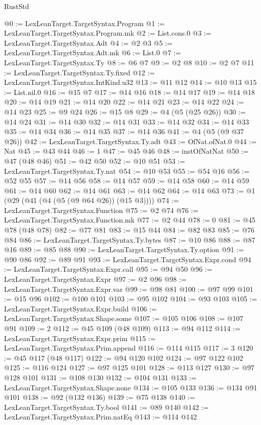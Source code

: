 \begin{lexlean}{RustStd}
\begin{coremodule}
@0 := LexLeanTarget.TargetSyntax.Program
@1 := LexLeanTarget.TargetSyntax.Program.mk
@2 := List.cons.{0}
@3 := LexLeanTarget.TargetSyntax.Adt
@4 := @2 @3
@5 := LexLeanTarget.TargetSyntax.Adt.mk
@6 := List.{0}
@7 := LexLeanTarget.TargetSyntax.Ty
@8 := @6 @7
@9 := @2 @8
@10 := @2 @7
@11 := LexLeanTarget.TargetSyntax.Ty.fixed
@12 := LexLeanTarget.TargetSyntax.IntKind.u32
@13 := @11 @12
@14 := @10 @13
@15 := List.nil.{0}
@16 := @15 @7
@17 := @14 @16
@18 := @14 @17
@19 := @14 @18
@20 := @14 @19
@21 := @14 @20
@22 := @14 @21
@23 := @14 @22
@24 := @14 @23
@25 := @9 @24
@26 := @15 @8
@29 := @4 (@5 (@25 @26))
@30 := @14 @24
@31 := @14 @30
@32 := @14 @31
@33 := @14 @32
@34 := @14 @33
@35 := @14 @34
@36 := @14 @35
@37 := @14 @36
@41 := @4 (@5 (@9 @37 @26))
@42 := LexLeanTarget.TargetSyntax.Ty.adt
@43 := OfNat.ofNat.{0}
@44 := Nat
@45 := @43 @44
@46 := 1
@47 := @45 @46
@48 := instOfNatNat
@50 := @47 (@48 @46)
@51 := @42 @50
@52 := @10 @51
@53 := LexLeanTarget.TargetSyntax.Ty.nat
@54 := @10 @53
@55 := @54 @16
@56 := @52 @55
@57 := @14 @56
@58 := @14 @57
@59 := @14 @58
@60 := @14 @59
@61 := @14 @60
@62 := @14 @61
@63 := @14 @62
@64 := @14 @63
@73 := @1 (@29 (@41 (@4 (@5 (@9 @64 @26)) (@15 @3))))
@74 := LexLeanTarget.TargetSyntax.Function
@75 := @2 @74
@76 := LexLeanTarget.TargetSyntax.Function.mk
@77 := @2 @44
@78 := 0
@81 := @45 @78 (@48 @78)
@82 := @77 @81
@83 := @15 @44
@84 := @82 @83
@85 := @76 @84
@86 := LexLeanTarget.TargetSyntax.Ty.bytes
@87 := @10 @86
@88 := @87 @16
@89 := @85 @88
@90 := LexLeanTarget.TargetSyntax.Ty.option
@91 := @90 @86
@92 := @89 @91
@93 := LexLeanTarget.TargetSyntax.Expr.cond
@94 := LexLeanTarget.TargetSyntax.Expr.call
@95 := @94 @50
@96 := LexLeanTarget.TargetSyntax.Expr
@97 := @2 @96
@98 := LexLeanTarget.TargetSyntax.Expr.var
@99 := @98 @81
@100 := @97 @99
@101 := @15 @96
@102 := @100 @101
@103 := @95 @102
@104 := @93 @103
@105 := LexLeanTarget.TargetSyntax.Expr.build
@106 := LexLeanTarget.TargetSyntax.Shape.some
@107 := @105 @106
@108 := @107 @91
@109 := 2
@112 := @45 @109 (@48 @109)
@113 := @94 @112
@114 := LexLeanTarget.TargetSyntax.Expr.prim
@115 := LexLeanTarget.TargetSyntax.Prim.append
@116 := @114 @115
@117 := 3
@120 := @45 @117 (@48 @117)
@122 := @94 @120 @102
@124 := @97 @122 @102
@125 := @116 @124
@127 := @97 @125 @101
@128 := @113 @127
@130 := @97 @128 @101
@131 := @108 @130
@132 := @104 @131
@133 := LexLeanTarget.TargetSyntax.Shape.none
@134 := @105 @133
@136 := @134 @91 @101
@138 := @92 (@132 @136)
@139 := @75 @138
@140 := LexLeanTarget.TargetSyntax.Ty.bool
@141 := @89 @140
@142 := LexLeanTarget.TargetSyntax.Prim.natEq
@143 := @114 @142

\end{coremodule}
\end{lexlean}
